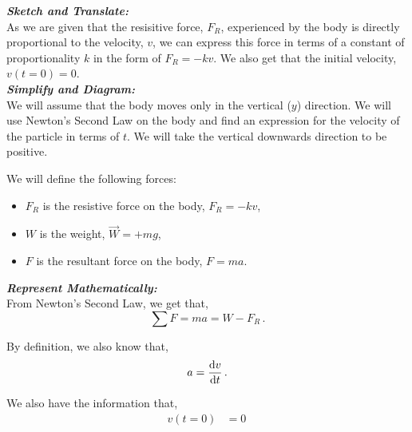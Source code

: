 \begin{subquestions}
\begin{subsubquestions}
\end{subsubquestions}


\subquestion

\begin{subsubquestions}
	
\subsubquestion

\textbf{\textit{Sketch and Translate:}} \\ 
As we are given that the resisitive force, $F_R$, experienced by the body is directly proportional to the velocity, $v$, we can express this force in terms of a constant of proportionality $k$ in the form of $F_R=-kv.$ We also get that the initial velocity, $v(t=0)=0$.\\




\textbf{\textit{Simplify and Diagram:}} \\ 
We will assume that the body moves only in the vertical ($y$) direction. We will use Newton's Second Law on the body and find an expression for the velocity of the particle in terms of $t$.
We will take the vertical downwards direction to be positive.

We will define the following forces: 
\begin{itemize}
	\item $F_R$ is the resistive force on the body, $F_R=-kv$,
	\item $W$ is the weight, $\vec{W}=+mg$,
	\item $F$ is the resultant force on the body, $F=ma$.
\end{itemize}




\textbf{\textit{Represent Mathematically:}} \\ 
From Newton's Second Law, we get that, 
\begin{equation}
	\sum F = ma = W - F_R \label{2005:q5:FEqn1} \,.
\end{equation}

By definition, we also know that,
\begin{equation}
	a = \frac{\mathrm{d}v}{\mathrm{d}t} \label{2005:q5:AEqn2} \,.
\end{equation}

We also have the information that,
\begin{align}
	v(t=0) & = 0 \,
\end{align}


\end{subsubquestions}
\end{subquestions}
